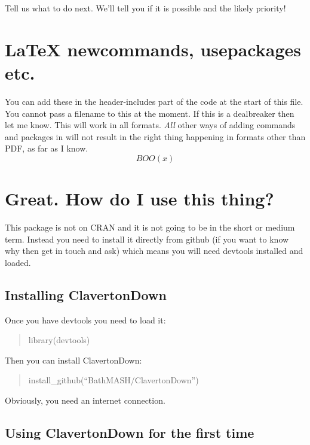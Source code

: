 \documentclass[
  10pt,
  a4paper]{article}
\theoremstyle{plain}
\theoremstyle{definition}
\theoremstyle{plain}
\theoremstyle{plain}
\theoremstyle{plain}
\theoremstyle{plain}
\theoremstyle{definition}
\theoremstyle{definition}
\theoremstyle{remark}
\theoremstyle{remark}
\begin{document}
Tell us what to do next. We'll tell you if it is possible and the likely priority!

\hypertarget{latex-newcommands-usepackages-etc.}{%
\section{LaTeX newcommands, usepackages etc.}\label{latex-newcommands-usepackages-etc.}}

You can add these in the header-includes part of the code at the start of this file. You cannot pass a filename to this at the moment. If this is a dealbreaker then let me know. This will work in all formats. \emph{All} other ways of adding commands and packages in will not result in the right thing happening in formats other than PDF, as far as I know.
\[
BOO(x)
\]

\hypertarget{great.-how-do-i-use-this-thing}{%
\section{Great. How do I use this thing?}\label{great.-how-do-i-use-this-thing}}

This package is not on CRAN and it is not going to be in the short or medium term. Instead you need to install it directly from github (if you want to know why then get in touch and ask) which means you will need devtools installed and loaded.

\hypertarget{installing-clavertondown}{%
\subsection{Installing ClavertonDown}\label{installing-clavertondown}}

Once you have devtools you need to load it:

\begin{quote}
library(devtools)
\end{quote}

Then you can install ClavertonDown:

\begin{quote}
install\_github(``BathMASH/ClavertonDown'')
\end{quote}

Obviously, you need an internet connection.

\hypertarget{using-clavertondown-for-the-first-time}{%
\subsection{Using ClavertonDown for the first time}\label{using-clavertondown-for-the-first-time}}
\end{document}
